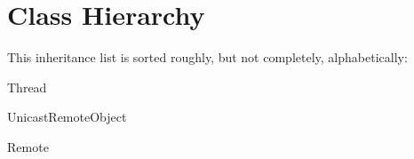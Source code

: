 \section{Class Hierarchy}
This inheritance list is sorted roughly, but not completely, alphabetically\+:\begin{DoxyCompactList}
\item {}
\item {}
\item {}
\item Thread\begin{DoxyCompactList}
\item {}
\end{DoxyCompactList}
\item Unicast\+Remote\+Object\begin{DoxyCompactList}
\item {}
\end{DoxyCompactList}
\item Remote\begin{DoxyCompactList}
\item {}
\begin{DoxyCompactList}
\item {}
\end{DoxyCompactList}
\end{DoxyCompactList}
\end{DoxyCompactList}
